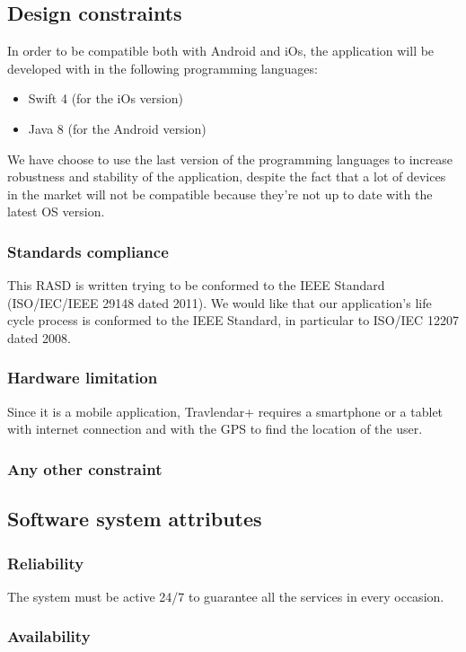 \documentclass[12pt,titlepage]{article}
\begin{document}
\subsection{Design constraints}\label{sec:mod1}
In order to be compatible both with Android and iOs, the application will be developed with in the following programming languages:
\begin{itemize}
\item Swift 4 (for the iOs version)
\item Java 8 (for the Android version)
\end{itemize}
We have choose to use the last version of the programming languages to increase robustness and stability of the application, despite the fact that a lot of devices in the market will not be compatible because they're not up to date with the latest OS version.

\subsubsection{Standards compliance}\label{sec:mod1}
This RASD is written trying to be conformed to the IEEE Standard (ISO/IEC/IEEE 29148 dated 2011).
We would like that our application's life cycle process is conformed to the IEEE Standard, in particular to ISO/IEC 12207 dated 2008.

\subsubsection{Hardware limitation}\label{sec:mod1}
Since it is a mobile application, Travlendar+ requires a smartphone or a tablet with internet connection and with the GPS to find the location of the user. 

\subsubsection{Any other constraint}\label{sec:mod1}
\subsection{Software system attributes}\label{sec:mod1}
\subsubsection{Reliability}\label{sec:mod1}
The system must be active 24/7 to guarantee all the services in every occasion. 

\subsubsection{Availability}\label{sec:mod1}
\end{document}
